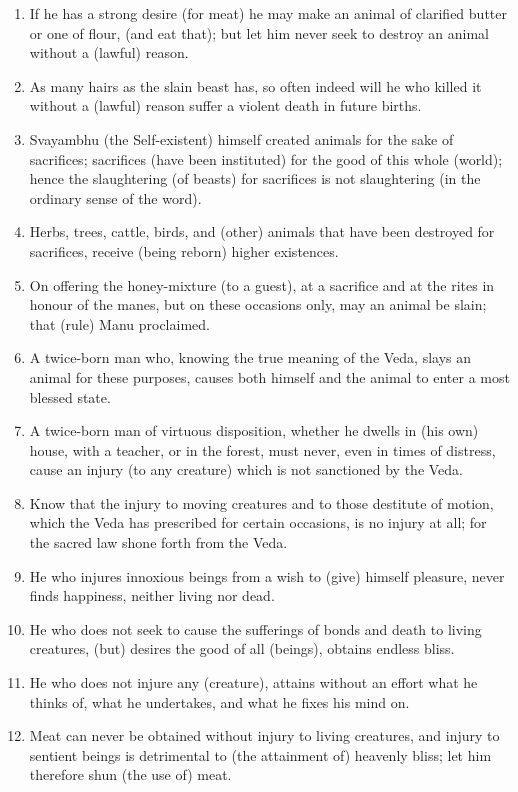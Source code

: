 \begin{enumerate}
\item If he has a strong desire (for meat) he may make an animal of clarified butter or one of flour, (and eat that); but let him never seek to destroy an animal without a (lawful) reason.
\item As many hairs as the slain beast has, so often indeed will he who killed it without a (lawful) reason suffer a violent death in future births.
\item Svayambhu (the Self-existent) himself created animals for the sake of sacrifices; sacrifices (have been instituted) for the good of this whole (world); hence the slaughtering (of beasts) for sacrifices is not slaughtering (in the ordinary sense of the word).
\item Herbs, trees, cattle, birds, and (other) animals that have been destroyed for sacrifices, receive (being reborn) higher existences.
\item On offering the honey-mixture (to a guest), at a sacrifice and at the rites in honour of the manes, but on these occasions only, may an animal be slain; that (rule) Manu proclaimed.
\item A twice-born man who, knowing the true meaning of the Veda, slays an animal for these purposes, causes both himself and the animal to enter a most blessed state.
\item A twice-born man of virtuous disposition, whether he dwells in (his own) house, with a teacher, or in the forest, must never, even in times of distress, cause an injury (to any creature) which is not sanctioned by the Veda.
\item Know that the injury to moving creatures and to those destitute of motion, which the Veda has prescribed for certain occasions, is no injury at all; for the sacred law shone forth from the Veda.
\item He who injures innoxious beings from a wish to (give) himself pleasure, never finds happiness, neither living nor dead.
\item He who does not seek to cause the sufferings of bonds and death to living creatures, (but) desires the good of all (beings), obtains endless bliss.
\item He who does not injure any (creature), attains without an effort what he thinks of, what he undertakes, and what he fixes his mind on.
\item Meat can never be obtained without injury to living creatures, and injury to sentient beings is detrimental to (the attainment of) heavenly bliss; let him therefore shun (the use of) meat.

\end{enumerate}
